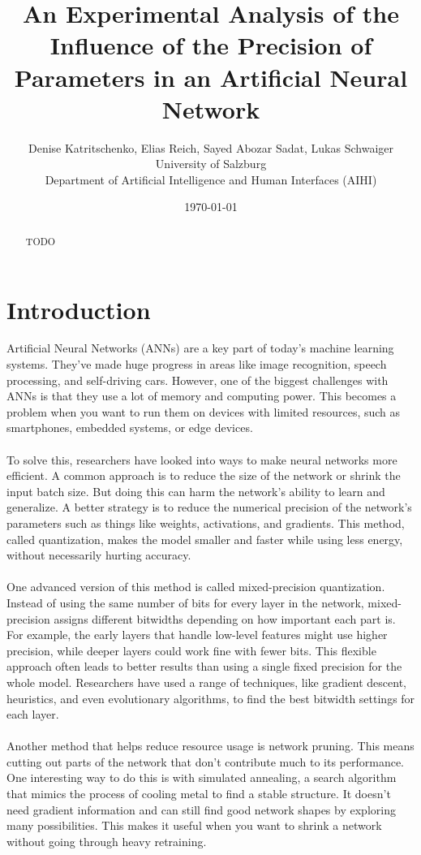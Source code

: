 \documentclass[11pt]{article}
\title{An Experimental Analysis of the Influence of the Precision of
	Parameters in an Artificial Neural Network}
\author{Denise Katritschenko, Elias Reich, Sayed Abozar Sadat, Lukas Schwaiger\\
	\small University of Salzburg\\	
	\small Department of Artificial Intelligence and Human Interfaces (AIHI) }
\date{\today}
\begin{document}
	
	\maketitle
	
	\begin{abstract}
		TODO
	\end{abstract}
	
	\section{Introduction}
	Artificial Neural Networks (ANNs) are a key part of today’s machine learning systems. They’ve made huge progress in areas like image recognition, speech processing, and self-driving cars. However, one of the biggest challenges with ANNs is that they use a lot of memory and computing power. This becomes a problem when you want to run them on devices with limited resources, such as smartphones, embedded systems, or edge devices. \\ \\
	To solve this, researchers have looked into ways to make neural networks more efficient. A common approach is to reduce the size of the network or shrink the input batch size. But doing this can harm the network’s ability to learn and generalize. A better strategy is to reduce the numerical precision of the network’s parameters such as things like weights, activations, and gradients. This method, called quantization, makes the model smaller and faster while using less energy, without necessarily hurting accuracy. \\ \\
	One advanced version of this method is called mixed-precision quantization. Instead of using the same number of bits for every layer in the network, mixed-precision assigns different bitwidths depending on how important each part is. For example, the early layers that handle low-level features might use higher precision, while deeper layers could work fine with fewer bits. This flexible approach often leads to better results than using a single fixed precision for the whole model. Researchers have used a range of techniques, like gradient descent, heuristics, and even evolutionary algorithms, to find the best bitwidth settings for each layer. \\ \\
	Another method that helps reduce resource usage is network pruning. This means cutting out parts of the network that don’t contribute much to its performance. One interesting way to do this is with simulated annealing, a search algorithm that mimics the process of cooling metal to find a stable structure. It doesn’t need gradient information and can still find good network shapes by exploring many possibilities. This makes it useful when you want to shrink a network without going through heavy retraining. \\ \\
\end{document}
